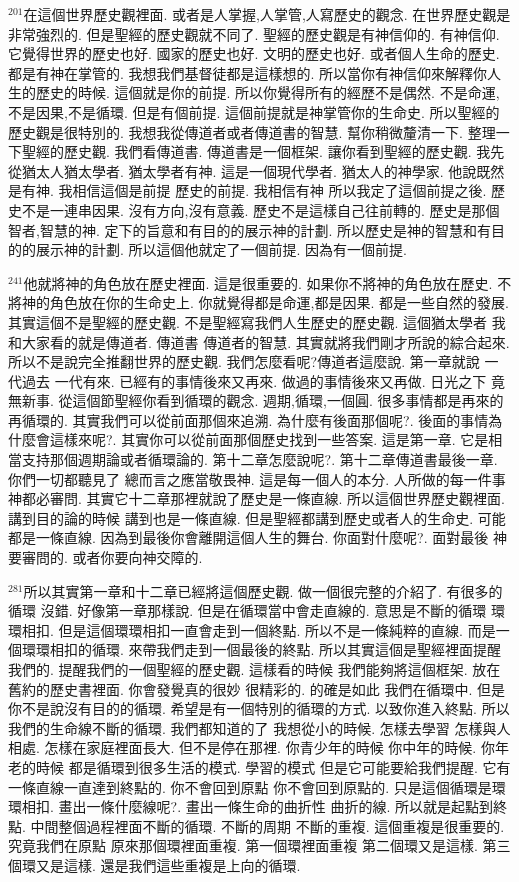 \documentclass{book}
\begin{document}
$^{201}$在這個世界歷史觀裡面.
或者是人掌握,人掌管,人寫歷史的觀念.
在世界歷史觀是非常強烈的.
但是聖經的歷史觀就不同了.
聖經的歷史觀是有神信仰的.
有神信仰.
它覺得世界的歷史也好.
國家的歷史也好.
文明的歷史也好.
或者個人生命的歷史.
都是有神在掌管的.
我想我們基督徒都是這樣想的.
所以當你有神信仰來解釋你人生的歷史的時候.
這個就是你的前提.
所以你覺得所有的經歷不是偶然.
不是命運,不是因果,不是循環.
但是有個前提.
這個前提就是神掌管你的生命史.
所以聖經的歷史觀是很特別的.
我想我從傳道者或者傳道書的智慧.
幫你稍微釐清一下.
整理一下聖經的歷史觀.
我們看傳道書.
傳道書是一個框架.
讓你看到聖經的歷史觀.
我先從猶太人猶太學者.
猶太學者有神.
這是一個現代學者.
猶太人的神學家.
他說既然是有神.
我相信這個是前提 歷史的前提.
我相信有神 所以我定了這個前提之後.
歷史不是一連串因果.
沒有方向,沒有意義.
歷史不是這樣自己往前轉的.
歷史是那個智者,智慧的神.
定下的旨意和有目的的展示神的計劃.
所以歷史是神的智慧和有目的的展示神的計劃.
所以這個他就定了一個前提.
因為有一個前提.

$^{241}$他就將神的角色放在歷史裡面.
這是很重要的.
如果你不將神的角色放在歷史.
不將神的角色放在你的生命史上.
你就覺得都是命運,都是因果.
都是一些自然的發展.
其實這個不是聖經的歷史觀.
不是聖經寫我們人生歷史的歷史觀.
這個猶太學者 我和大家看的就是傳道者.
傳道書 傳道者的智慧.
其實就將我們剛才所說的綜合起來.
所以不是說完全推翻世界的歷史觀.
我們怎麼看呢?傳道者這麼說.
第一章就說 一代過去 一代有來.
已經有的事情後來又再來.
做過的事情後來又再做.
日光之下 竟無新事.
從這個節聖經你看到循環的觀念.
週期,循環,一個圓.
很多事情都是再來的 再循環的.
其實我們可以從前面那個來追溯.
為什麼有後面那個呢?.
後面的事情為什麼會這樣來呢?.
其實你可以從前面那個歷史找到一些答案.
這是第一章.
它是相當支持那個週期論或者循環論的.
第十二章怎麼說呢?.
第十二章傳道書最後一章.
你們一切都聽見了 總而言之應當敬畏神.
這是每一個人的本分.
人所做的每一件事 神都必審問.
其實它十二章那裡就說了歷史是一條直線.
所以這個世界歷史觀裡面.
講到目的論的時候 講到也是一條直線.
但是聖經都講到歷史或者人的生命史.
可能都是一條直線.
因為到最後你會離開這個人生的舞台.
你面對什麼呢?.
面對最後 神要審問的.
或者你要向神交障的.

$^{281}$所以其實第一章和十二章已經將這個歷史觀.
做一個很完整的介紹了.
有很多的循環 沒錯.
好像第一章那樣說.
但是在循環當中會走直線的.
意思是不斷的循環 環環相扣.
但是這個環環相扣一直會走到一個終點.
所以不是一條純粹的直線.
而是一個環環相扣的循環.
來帶我們走到一個最後的終點.
所以其實這個是聖經裡面提醒我們的.
提醒我們的一個聖經的歷史觀.
這樣看的時候 我們能夠將這個框架.
放在舊約的歷史書裡面.
你會發覺真的很妙 很精彩的.
的確是如此 我們在循環中.
但是你不是說沒有目的的循環.
希望是有一個特別的循環的方式.
以致你進入終點.
所以我們的生命線不斷的循環.
我們都知道的了 我想從小的時候.
怎樣去學習 怎樣與人相處.
怎樣在家庭裡面長大.
但不是停在那裡.
你青少年的時候 你中年的時候.
你年老的時候 都是循環到很多生活的模式.
學習的模式 但是它可能要給我們提醒.
它有一條直線一直達到終點的.
你不會回到原點 你不會回到原點的.
只是這個循環是環環相扣.
畫出一條什麼線呢?.
畫出一條生命的曲折性 曲折的線.
所以就是起點到終點.
中間整個過程裡面不斷的循環.
不斷的周期 不斷的重複.
這個重複是很重要的.
究竟我們在原點 原來那個環裡面重複.
第一個環裡面重複 第二個環又是這樣.
第三個環又是這樣.
還是我們這些重複是上向的循環.
\end{document}
